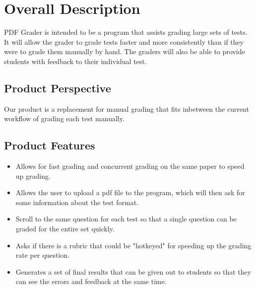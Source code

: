 \section{Overall Description}
%
PDF Grader is intended to be a program that assists grading large sets of tests.
It will allow the grader to grade tests faster and more consistently than if they were to grade them manually by hand.
The graders will also be able to provide students with feedback to their individual test.

\subsection{Product Perspective}
Our product is a replacement for manual grading that fits inbetween the current workflow of grading each test manually.

\subsection{Product Features}
\begin{itemize}
    \item Allows for fast grading and concurrent grading on the same paper to speed up grading.
    \item Allows the user to upload a pdf file to the program, which will then ask for some information about the test format.
    \item Scroll to the same question for each test so that a single question can be graded for the entire set quickly.
    \item Asks if there is a rubric that could be "hotkeyed" for speeding up the grading rate per question.
    \item Generates a set of final results that can be given out to students so that they can see the errors and feedback at the same time.
\end{itemize}

